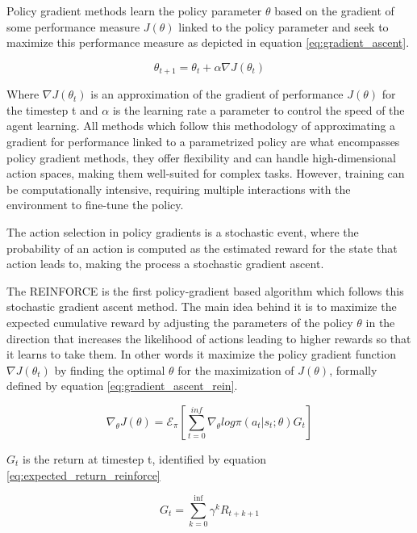 Policy gradient methods learn the policy parameter $\theta$ based on the gradient of some performance measure $J(\theta)$ linked to the policy parameter and seek to maximize this performance measure as depicted in equation \ref{eq:gradient_ascent}.

\begin{equation}
    \label{eq:gradient_ascent}
    \theta_{t+1} = \theta_t + \alpha \nabla J (\theta_t)
\end{equation}

Where $\nabla J (\theta_t)$ is an approximation of the gradient of performance $J(\theta)$ for the timestep t and $\alpha$ is the learning rate a parameter to control the speed of the agent learning. All methods which follow this methodology of approximating a gradient for performance linked to a parametrized policy are what encompasses policy gradient methods, they offer flexibility and can handle high-dimensional action spaces, making them well-suited for complex tasks. However, training can be computationally intensive, requiring multiple interactions with the environment to fine-tune the policy.

The action selection in policy gradients is a stochastic event, where the probability of an action is computed as the estimated reward for the state that action leads to, making the process a stochastic gradient ascent.

The REINFORCE \cite{sutton1999policy} is the first policy-gradient based algorithm which follows this stochastic gradient ascent method. The main idea behind it is to maximize the expected cumulative reward by adjusting the parameters of the policy $\theta$ in the direction that increases the likelihood of actions leading to higher rewards so that it learns to take them. In other words it maximize the policy gradient function $\nabla J (\theta_t)$ by finding the optimal $\theta$ for the maximization of $J(\theta)$, formally defined by equation \ref{eq:gradient_ascent_rein}.

\begin{equation}
    \label{eq:gradient_ascent_rein}
    \nabla_\theta J(\theta) = \mathcal{E}_\pi[\sum_{t=0}^{inf}\nabla_\theta log \pi(a_t|s_t;\theta)G_t]
\end{equation}

$G_t$ is the return at timestep t, identified by equation \ref{eq:expected_return_reinforce}

\begin{equation}
    \label{eq:expected_return_reinforce}
    G_t = \sum_{k=0}^{\inf} \gamma^k R_{t+k+1}
\end{equation}

